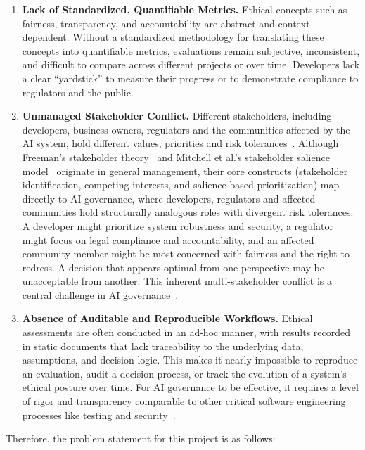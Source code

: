 \begin{enumerate}[leftmargin=2em]
  \item \textbf{Lack of Standardized, Quantifiable Metrics.} Ethical concepts such as fairness, transparency, and accountability are abstract and context-dependent. Without a standardized methodology for translating these concepts into quantifiable metrics, evaluations remain subjective, inconsistent, and difficult to compare across different projects or over time. Developers lack a clear \enquote{yardstick} to measure their progress or to demonstrate compliance to regulators and the public.

  \item \textbf{Unmanaged Stakeholder Conflict.} Different stakeholders, including developers, business owners, regulators and the communities affected by the AI system, hold different values, priorities and risk tolerances~\cite{freeman1984stakeholder}. Although Freeman's stakeholder theory~\cite{freeman1984stakeholder} and Mitchell et al.'s stakeholder salience model~\cite{mitchell1997stakeholder} originate in general management, their core constructs (stakeholder identification, competing interests, and salience-based prioritization) map directly to AI governance, where developers, regulators and affected communities hold structurally analogous roles with divergent risk tolerances. A developer might prioritize system robustness and security, a regulator might focus on legal compliance and accountability, and an affected community member might be most concerned with fairness and the right to redress. A decision that appears optimal from one perspective may be unacceptable from another. This inherent multi-stakeholder conflict is a central challenge in AI governance~\cite{mitchell1997stakeholder}.

  \item \textbf{Absence of Auditable and Reproducible Workflows.} Ethical assessments are often conducted in an ad-hoc manner, with results recorded in static documents that lack traceability to the underlying data, assumptions, and decision logic. This makes it nearly impossible to reproduce an evaluation, audit a decision process, or track the evolution of a system's ethical posture over time. For AI governance to be effective, it requires a level of rigor and transparency comparable to other critical software engineering processes like testing and security~\cite{amershi2019se4ml}.
\end{enumerate}

Therefore, the problem statement for this project is as follows:

